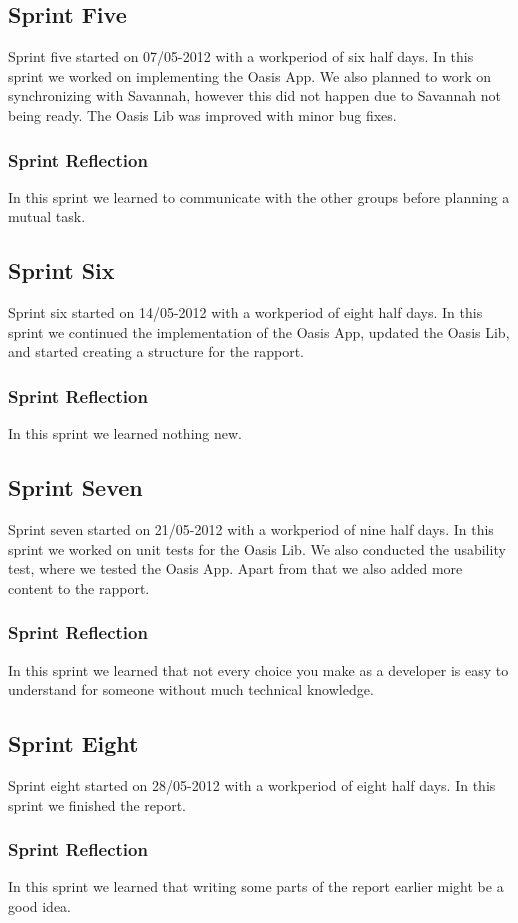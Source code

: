 \subsection{Sprint Five}
Sprint five started on 07/05-2012 with a workperiod of six half days.
In this sprint we worked on implementing the Oasis App.
We also planned to work on synchronizing with Savannah, however this did not happen due to Savannah not being ready.
The Oasis Lib was improved with minor bug fixes.

\subsubsection{Sprint Reflection}
In this sprint we learned to communicate with the other groups before planning a mutual task.

\subsection{Sprint Six}
Sprint six started on 14/05-2012 with a workperiod of eight half days. In this sprint we continued the implementation of the Oasis App, updated the Oasis Lib, and started creating a structure for the rapport.

\subsubsection{Sprint Reflection}
In this sprint we learned nothing new.

\subsection{Sprint Seven}
Sprint seven started on 21/05-2012 with a workperiod of nine half days.
In this sprint we worked on unit tests for the Oasis Lib.
We also conducted the usability test, where we tested the Oasis App.
Apart from that we also added more content to the rapport.

\subsubsection{Sprint Reflection}
In this sprint we learned that not every choice you make as a developer is easy to understand for someone without much technical knowledge.

\subsection{Sprint Eight}
Sprint eight started on 28/05-2012 with a workperiod of eight half days. In this sprint we finished the report.

\subsubsection{Sprint Reflection}
In this sprint we learned that writing some parts of the report earlier might be a good idea.